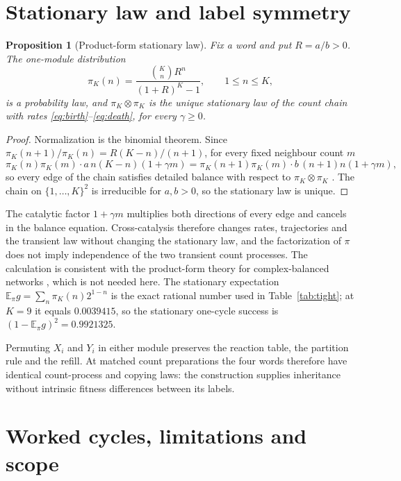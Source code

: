 \documentclass[11pt,a4paper]{article}
\theoremstyle{plain}
\newtheorem{proposition}[theorem]{Proposition}
\theoremstyle{definition}
\theoremstyle{remark}
\newcommand{\EE}{\mathbb E}
\begin{document}
\section{Stationary law and label symmetry}\label{sec:stationary}
\begin{proposition}[Product-form stationary law]\label{prop:stationary}
Fix a word and put $R=a/b>0$. The one-module distribution
\begin{equation}\label{eq:stationary}
 \pi_K(n)=\frac{\binom Kn R^n}{(1+R)^K-1},\qquad 1\le n\le K ,
\end{equation}
is a probability law, and $\pi_K\otimes\pi_K$ is the unique stationary law of the count chain with rates \eqref{eq:birth}--\eqref{eq:death}, for every $\gamma\ge0$.
\end{proposition}
\begin{proof}
Normalization is the binomial theorem. Since $\pi_K(n+1)/\pi_K(n)=R(K-n)/(n+1)$, for every fixed neighbour count $m$
\[
 \pi_K(n)\pi_K(m)\cdot a\,n(K-n)(1+\gamma m)=\pi_K(n+1)\pi_K(m)\cdot b\,(n+1)n(1+\gamma m),
\]
so every edge of the chain satisfies detailed balance with respect to $\pi_K\otimes\pi_K$ \citep{kelly1979}. The chain on $\{1,\dots,K\}^2$ is irreducible for $a,b>0$, so the stationary law is unique.
\end{proof}

The catalytic factor $1+\gamma m$ multiplies both directions of every edge and cancels in the balance equation. Cross-catalysis therefore changes rates, trajectories and the transient law without changing the stationary law, and the factorization of $\pi$ does not imply independence of the two transient count processes. The calculation is consistent with the product-form theory for complex-balanced networks \citep{anderson2010}, which is not needed here. The stationary expectation $\EE_\pi g=\sum_n\pi_K(n)2^{1-n}$ is the exact rational number used in Table~\ref{tab:tight}; at $K=9$ it equals $0.0039415$, so the stationary one-cycle success is $(1-\EE_\pi g)^2=0.9921325$.

Permuting $X_i$ and $Y_i$ in either module preserves the reaction table, the partition rule and the refill. At matched count preparations the four words therefore have identical count-process and copying laws: the construction supplies inheritance without intrinsic fitness differences between its labels.

\section{Worked cycles, limitations and scope}\label{sec:limits}
\end{document}
